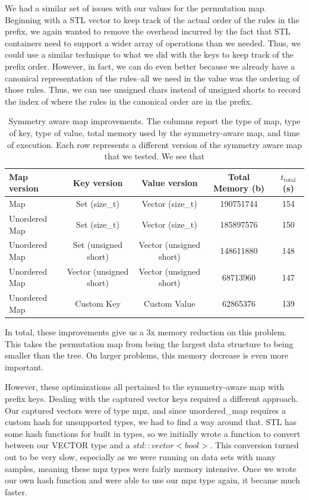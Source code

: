 We had a similar set of issues with our values for the permutation map.
Beginning with a STL vector to keep track of the actual order of the rules in the prefix, we again wanted to remove the overhead incurred by the fact that STL containers need to support a wider array of operations than we needed.
Thus, we could use a similar technique to what we did with the keys to keep track of the prefix order.
However, in fact, we can do even better because we already have a canonical representation of the rules--all we need in the value was the ordering of those rules.
Thus, we can use unsigned chars instead of unsigned shorts to record the index of where the rules in the canonical order are in the prefix.

\begin{table}[t!]
\begin{tabular}{l | c | c | c | c }
Map version & Key version & Value version & Total Memory (b) & $t_\text{total}$ (s)\\
\hline
Map & Set (size\_t) & Vector (size\_t) & 190751744 & 154 \\
Unordered Map & Set (size\_t) & Vector (size\_t) & 185897576 & 150 \\
Unordered Map & Set  (unsigned short) & Vector (unsigned short) & 148611880 & 148 \\
Unordered Map & Vector (unsigned short) & Vector (unsigned short) & 68713960 & 147 \\
Unordered Map & Custom Key & Custom Value & 62865376 & 139 \\
\end{tabular}
\vspace{4mm}
\caption{Symmetry aware map improvements.
%
The columns report the type of map,
type of key, type of value,
total memory used by the symmetry-aware map, and time of execution.
%
Each row represents a different version of the symmetry aware map that we tested.
We see that 
}
\label{tab:pmap}
\end{table}

In total, these improvements give us a 3x memory reduction on this problem.
This takes the permutation map from being the largest data structure to being smaller than the tree.
On larger problems, this memory decrease is even more important.

However, these optimizations all pertained to the symmetry-aware map with prefix keys.
Dealing with the captured vector keys required a different approach.
Our captured vectors were of type mpz, and since unordered\_map requires a custom hash for unsupported types, we had to find a way around that.
STL has some hash functions for built in types, so we initially wrote a function to convert between our VECTOR type and a $std::vector<bool>$.
This conversion turned out to be very slow, especially as we were running on data sets with many samples, meaning these mpz types were fairly memory intensive.
Once we wrote our own hash function and were able to use our mpz type again, it became much faster.

